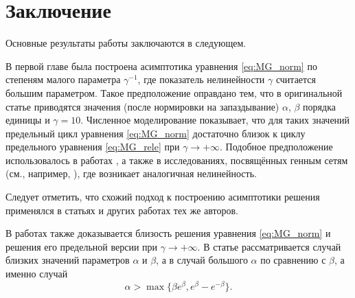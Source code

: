 \chapter*{Заключение}                       %


Основные результаты работы заключаются в следующем.


В первой главе была построена асимптотика уравнения \eqref{eq:MG_norm} по степеням малого параметра $\gamma^{-1}$, где показатель нелинейности $\gamma$ считается большим параметром. Такое предположение оправдано тем, что в оригинальной статье \cite{Mackey1977} приводятся значения (после нормировки на запаздывание) $\alpha$, $\beta$ порядка единицы и $\gamma = 10$. Численное моделирование показывает, что для таких значений предельный цикл уравнения \eqref{eq:MG_norm} достаточно близок к циклу предельного уравнения \eqref{eq:MG_rele} при $\gamma \to +\infty$. Подобное предположение использовалось в работах \cite{Bartha2021, Krisztin2020}, а также в исследованиях, посвящённых генным сетям (см., например, \cite{Volokitin2004}), где возникает аналогичная нелинейность.

Следует отметить, что схожий подход к построению асимптотики решения применялся в статьях \cite{Kolesov2010, Kolesov1997, Glyzin2013} и других работах тех же авторов.

В работах \cite{Bartha2021, Krisztin2020} также доказывается близость решения уравнения \eqref{eq:MG_norm} и решения его предельной версии при $\gamma \to +\infty$. В статье \cite{Krisztin2020} рассматривается случай близких значений параметров $\alpha$ и $\beta$, а в \cite{Bartha2021} случай большого $\alpha$ по сравнению с $\beta$, а именно случай 
\begin{equation*}
	\label{eq:cond_Bartha}
	\alpha > \max\{\beta e^\beta, e^\beta - e^{-\beta}\}.   
\end{equation*}

